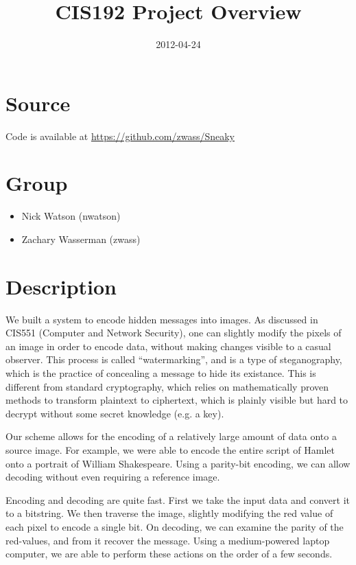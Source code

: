 \documentclass[11pt]{article}
\title{CIS192 Project Overview}
\date{2012-04-24}
\begin{document}
\maketitle



\section{Source}
\label{sec-1}

  Code is available at \href{https://github.com/zwass/Sneaky}{https://github.com/zwass/Sneaky}

\section{Group}
\label{sec-2}

\begin{itemize}
\item Nick Watson (nwatson)
\item Zachary Wasserman (zwass)
\end{itemize}
\section{Description}
\label{sec-3}

  We built a system to encode hidden messages into images. As
  discussed in CIS551 (Computer and Network Security), one can
  slightly modify the pixels of an image in order to encode data,
  without making changes visible to a casual observer. This process is
  called ``watermarking'', and is a type of steganography, which is the
  practice of concealing a message to hide its existance. This is
  different from standard cryptography, which relies on mathematically
  proven methods to transform plaintext to ciphertext, which is plainly
  visible but hard to decrypt without some secret knowledge (e.g. a key).

  Our scheme allows for the encoding of a relatively large amount of
  data onto a source image. For example, we were able to encode the
  entire script of Hamlet onto a portrait of William
  Shakespeare. Using a parity-bit encoding, we can allow decoding
  without even requiring a reference image.

  Encoding and decoding are quite fast. First we take the input
  data and convert it to a bitstring. We then traverse the image,
  slightly modifying the red value of each pixel to encode a single bit.
  On decoding,
  we can examine the parity of the red-values, and from it recover the
  message. Using a medium-powered laptop computer, we are able to
  perform these actions on the order of a few seconds.
\end{document}
